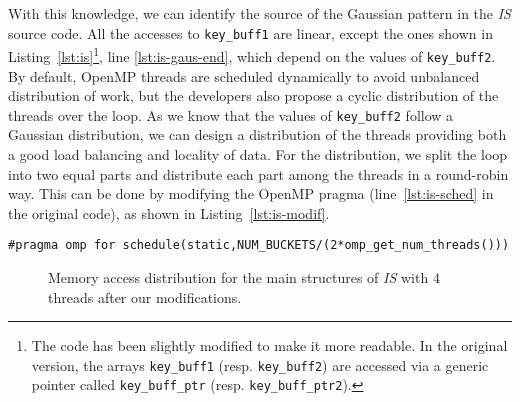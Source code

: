 With this knowledge, we can identify the source of the
Gaussian pattern in the \emph{IS} source code. All the accesses to \texttt{key\_buff1} are linear,
except the ones shown in Listing~\ref{lst:is}\footnote{
    The code has been slightly modified to make it more readable. In the
    original version, the arrays \texttt{key\_buff1} (resp. \texttt{key\_buff2})
    are accessed via a generic pointer called \texttt{key\_buff\_ptr} (resp.
    \texttt{key\_buff\_ptr2}).
}, line \ref{lst:is-gaus-end}, which depend on the values of
\texttt{key\_buff2}.
By default, OpenMP threads are scheduled dynamically to avoid unbalanced
distribution of work, but the developers also propose a cyclic distribution
of the threads over the loop. As we know that the values of \texttt{key\_buff2}
follow a Gaussian distribution, we can design a distribution of the threads
providing both a good load balancing and locality of data. For the distribution, we split
the loop into two equal parts and distribute each part among the threads in a round-robin way. This can be done by modifying the OpenMP pragma (line~\ref{lst:is-sched} in the original code), as shown
in Listing~\ref{lst:is-modif}.

\begin{lstlisting}[float=!ht,caption=Optimization for \emph{IS}., label=lst:is-modif]
#pragma omp for schedule(static,NUM_BUCKETS/(2*omp_get_num_threads()))
\end{lstlisting}

\begin{figure}[!p]
    \centering


    \vspace{-3mm}

    \vspace{-3mm}

    \vspace{-3mm}
    \caption{Memory access distribution for the main structures of
        \emph{IS} with $4$ threads after our modifications.}
    \label{fig:is-behaviour-modif}
\end{figure}



